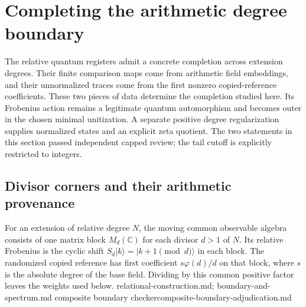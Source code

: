 \section{Completing the arithmetic degree boundary}
\label{sec:composite-degree-completion}

The relative quantum registers admit a concrete completion across extension
degrees. Their finite comparison maps come from arithmetic field embeddings,
and their unnormalized traces come from the first nonzero copied-reference
coefficients. These two pieces of data determine the completion studied
here. Its Frobenius action remains a legitimate quantum automorphism and
becomes outer in the chosen minimal unitization. A separate positive degree
regularization supplies normalized states and an explicit zeta quotient.
The two statements in this section passed independent capped review;
the tail cutoff is explicitly restricted to integers.

\subsection{Divisor corners and their arithmetic provenance}

For an extension of relative degree $N$, the moving common observable
algebra consists of one matrix block $M_d(\mathbb C)$ for each divisor
$d>1$ of $N$. Its relative Frobenius is the cyclic shift
$S_d|k\rangle=|k+1\pmod d\rangle$ in each block. The randomized copied
reference has first coefficient $s\varphi(d)/d$ on that block, where
$s$ is the absolute degree of the base field. Dividing by this common
positive factor leaves the weights used below.
{relational-construction.md; boundary-and-spectrum.md}
{composite boundary checker}{composite-boundary-adjudication.md}

